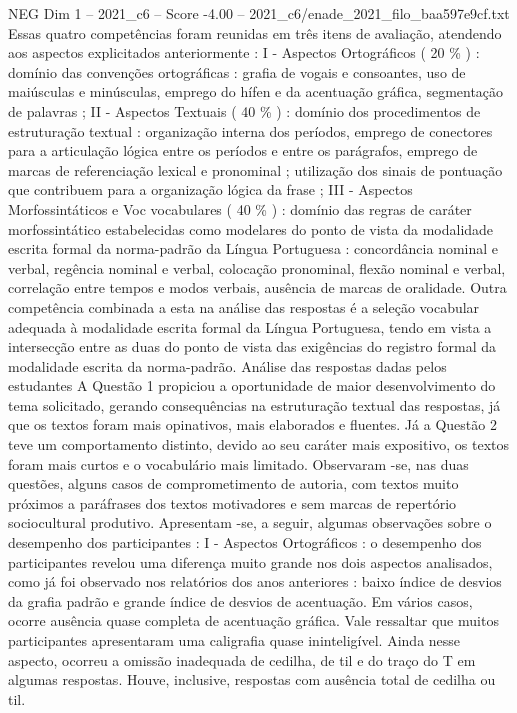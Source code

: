 \begin{textsample}{NEG Dim 1 – 2021\_c6 – Score -4.00 – 2021\_c6/enade\_2021\_filo\_baa597e9cf.txt}
Essas quatro competências foram reunidas em três itens de avaliação, atendendo aos aspectos explicitados anteriormente : I - Aspectos Ortográficos ( 20 \% ) : domínio das convenções ortográficas : grafia de vogais e consoantes, uso de maiúsculas e minúsculas, emprego do hífen e da acentuação gráfica, segmentação de palavras ; II - Aspectos Textuais ( 40 \% ) : domínio dos procedimentos de estruturação textual : organização interna dos períodos, emprego de conectores para a articulação lógica entre os períodos e entre os parágrafos, emprego de marcas de referenciação lexical e pronominal ; utilização dos sinais de pontuação que contribuem para a organização lógica da frase ; III - Aspectos Morfossintáticos e Voc vocabulares ( 40 \% ) : domínio das regras de caráter morfossintático estabelecidas como modelares do ponto de vista da modalidade escrita formal da norma-padrão da Língua Portuguesa : concordância nominal e verbal, regência nominal e verbal, colocação pronominal, flexão nominal e verbal, correlação entre tempos e modos verbais, ausência de marcas de oralidade.
Outra competência combinada a esta na análise das respostas é a seleção vocabular adequada à modalidade escrita formal da Língua Portuguesa, tendo em vista a intersecção entre as duas do ponto de vista das exigências do registro formal da modalidade escrita da norma-padrão.
Análise das respostas dadas pelos estudantes A Questão 1 propiciou a oportunidade de maior desenvolvimento do tema solicitado, gerando consequências na estruturação textual das respostas, já que os textos foram mais opinativos, mais elaborados e fluentes.
Já a Questão 2 teve um comportamento distinto, devido ao seu caráter mais expositivo, os textos foram mais curtos e o vocabulário mais limitado.
Observaram -se, nas duas questões, alguns casos de comprometimento de autoria, com textos muito próximos a paráfrases dos textos motivadores e sem marcas de repertório sociocultural produtivo.
Apresentam -se, a seguir, algumas observações sobre o desempenho dos participantes : I - Aspectos Ortográficos : o desempenho dos participantes revelou uma diferença muito grande nos dois aspectos analisados, como já foi observado nos relatórios dos anos anteriores : baixo índice de desvios da grafia padrão e grande índice de desvios de acentuação.
Em vários casos, ocorre ausência quase completa de acentuação gráfica.
Vale ressaltar que muitos participantes apresentaram uma caligrafia quase ininteligível.
Ainda nesse aspecto, ocorreu a omissão inadequada de cedilha, de til e do traço do T em algumas respostas.
Houve, inclusive, respostas com ausência total de cedilha ou til.

\end{textsample}

